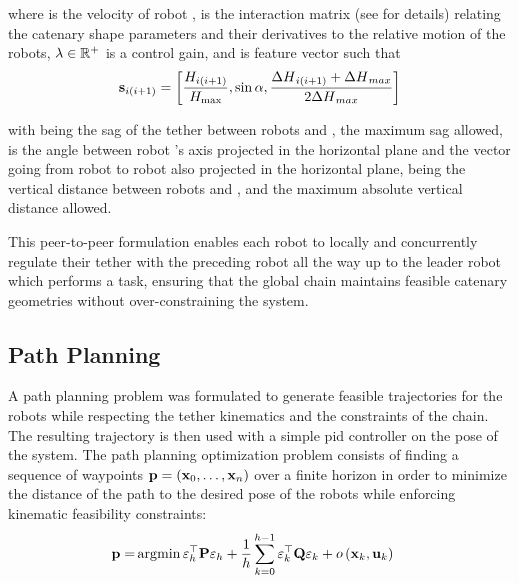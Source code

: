 where  is the velocity of robot ,  is the interaction matrix (see
\cite{moreiraVisualServoingDeformable2019} for details) relating the catenary shape parameters and
their derivatives to the relative motion of the robots, $\lambda \in \mathbb{R}^{+}$ is a
control gain, and  is feature vector such that
\begin{align}
	\ldvect{s}{i(i+1)} = \left[\frac{\ldscal{H}{i(i+1)}}{\ldscal{H}{\text{max}}}, \sin{\scal{\alpha}}, \frac{\ldscal{\Delta H}{i(i+1)} + \ldscal{\Delta H}{max}}{2\ldscal{\Delta H}{max}}\right]
\end{align}

with  being the sag of the tether between robots  and ,
 the maximum sag allowed, \scal{\alpha} is the angle between robot
's  axis projected in the horizontal plane and the vector going from robot
 to robot  also projected in the horizontal plane, 
being the vertical distance between robots  and , and  the maximum absolute vertical distance allowed.

This peer-to-peer formulation enables each robot to locally and concurrently regulate their tether
with the preceding robot all the way up to the leader robot which performs a task, ensuring that
the global chain maintains feasible catenary geometries without over-constraining the system.

\subsection{Path Planning}
\label{rcc_c_path_planning}

A path planning problem was formulated to generate feasible trajectories for the robots while
respecting the tether kinematics and the constraints of the chain. The resulting trajectory is then
used with a simple \ac{pid} controller on the pose of the system. The path planning optimization
problem consists of finding a sequence of waypoints $\vect{p}=\left(\ldvect{x}{0}, \dots,
	\ldvect{x}{n}\right)$ over a finite horizon \mpch{} in order to minimize the distance of the path
to the desired pose of the robots while enforcing kinematic feasibility constraints:
\begin{align}
	\vect{p} = & \argmin{\lures{h}{\top} \matr{P} \res{h}
	+ \frac{1}{\mpch{}}\sum_{k=0}^{\mpch{}-1}{\lures{k}{\top} \matr{Q} \res{k}  + o\left(\ldvect{x}{k}, \ldvect{u}{k}\right)}}
	\label{rcc_c_pp_cost}
\end{align}


